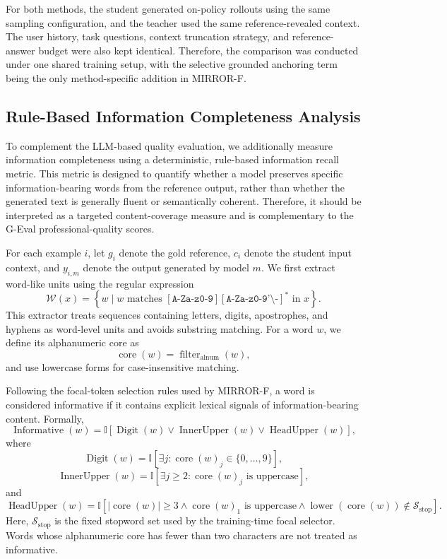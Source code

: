 \documentclass{article} %
\begin{document}
For both methods, the student generated on-policy rollouts using the same
sampling configuration, and the teacher used the same reference-revealed
context. The user history, task questions, context truncation strategy, and
reference-answer budget were also kept identical. Therefore, the comparison
was conducted under one shared training setup, with the selective grounded
anchoring term being the only method-specific addition in MIRROR-F.
\subsection{Rule-Based Information Completeness Analysis}
\label{app:information_completeness}

To complement the LLM-based quality evaluation, we additionally measure
information completeness using a deterministic, rule-based information
recall metric. This metric is designed to quantify whether a model preserves
specific information-bearing words from the reference output, rather than
whether the generated text is generally fluent or semantically coherent.
Therefore, it should be interpreted as a targeted content-coverage measure
and is complementary to the G-Eval professional-quality scores.

For each example $i$, let $g_i$ denote the gold reference, $c_i$ denote the
student input context, and $y_{i,m}$ denote the output generated by model
$m$. We first extract word-like units using the regular expression
\[
\mathcal{W}(x)
=
\left\{
w \mid
w \text{ matches } [\texttt{A-Za-z0-9}][\texttt{A-Za-z0-9'\textbackslash-}]^*
\text{ in } x
\right\}.
\]
This extractor treats sequences containing letters, digits, apostrophes, and
hyphens as word-level units and avoids substring matching. For a word $w$, we
define its alphanumeric core as
\[
\operatorname{core}(w)
=
\operatorname{filter}_{\mathrm{alnum}}(w),
\]
and use lowercase forms for case-insensitive matching.

Following the focal-token selection rules used by MIRROR-F, a word is
considered informative if it contains explicit lexical signals of
information-bearing content. Formally,
\[
\operatorname{Informative}(w)
=
\mathbb{I}\left[
\operatorname{Digit}(w)
\lor
\operatorname{InnerUpper}(w)
\lor
\operatorname{HeadUpper}(w)
\right],
\]
where
\[
\operatorname{Digit}(w)
=
\mathbb{I}\left[
\exists j:\operatorname{core}(w)_j\in\{0,\ldots,9\}
\right],
\]
\[
\operatorname{InnerUpper}(w)
=
\mathbb{I}\left[
\exists j\geq 2:
\operatorname{core}(w)_j \text{ is uppercase}
\right],
\]
and
\[
\operatorname{HeadUpper}(w)
=
\mathbb{I}\left[
|\operatorname{core}(w)|\geq 3
\land
\operatorname{core}(w)_1 \text{ is uppercase}
\land
\operatorname{lower}(\operatorname{core}(w))
\notin\mathcal{S}_{\mathrm{stop}}
\right].
\]
Here, $\mathcal{S}_{\mathrm{stop}}$ is the fixed stopword set used by the
training-time focal selector. Words whose alphanumeric core has fewer than
two characters are not treated as informative.
\end{document}
